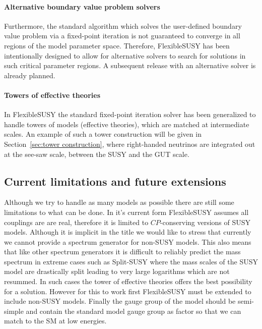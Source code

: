 \documentclass[final,3p,11pt,pdflatex]{elsarticle}
\makeatletter
\newcommand{\fs}{FlexibleSUSY\@\xspace}
\newcommand{\secref}[1]{Section~\ref{#1}}
\makeatother
\begin{document}
\paragraph{Alternative boundary value problem solvers}

Furthermore, the standard algorithm which solves the user-defined
boundary value problem via a fixed-point iteration is not guaranteed
to converge in all regions of the model parameter space.  Therefore,
\fs has been intentionally designed to allow for alternative solvers
to search for solutions in such critical parameter regions.  A
subsequent release with an alternative solver is already planned.

\paragraph{Towers of effective theories}

In \fs the standard fixed-point iteration solver has been generalized
to handle towers of models (effective theories), which are matched at
intermediate scales.  An example of such a tower construction will be
given in \secref{sec:tower construction}, where right-handed neutrinos
are integrated out at the see-saw scale, between the SUSY and the GUT
scale.

\subsection{Current limitations and future extensions}
Although we try to handle as many models as possible there are still
some limitations to what can be done. In it's current form \fs assumes
all couplings are are real, therefore it is limited to $CP$-conserving
versions of SUSY models.   Although it is implicit in the
title we would like to stress that currently we cannot provide a
spectrum generator for non-SUSY models.  This also means that like
other spectrum generators it is difficult to reliably predict the mass
spectrum in extreme cases such as Split-SUSY
\cite{Wells:2003tf,ArkaniHamed:2004fb,Giudice:2004tc} where the mass
scales of the SUSY model are drastically split leading to very large
logarithms which are not resummed.  In such cases the tower of
effective theories offers the best possibility for a solution.
However for this to work first \fs must be extended to include
non-SUSY models.  Finally the gauge group of the model should be
semi-simple and contain the standard model gauge group as factor so
that we can match to the SM at low energies.
\end{document}
